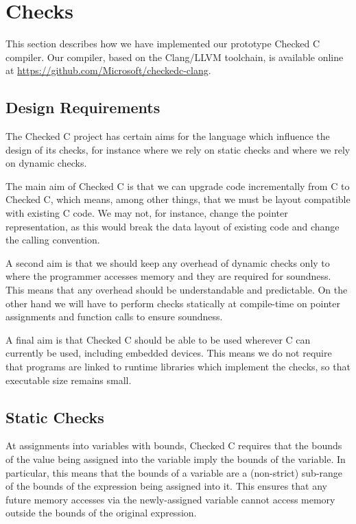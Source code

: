 \chapter{Checks}
\label{sec:checks}

This section describes how we have implemented our prototype Checked C
compiler. Our compiler, based on the Clang/LLVM toolchain, is
available online at \url{https://github.com/Microsoft/checkedc-clang}.

\section{Design Requirements}

The Checked C project has certain aims for the language which
influence the design of its checks, for instance where we rely on
static checks and where we rely on dynamic checks.

The main aim of Checked C is that we can upgrade code incrementally
from C to Checked C, which means, among other things, that we must
be layout compatible with existing C code. We may not, for instance,
change the pointer representation, as this would break the data layout
of existing code and change the calling convention.

A second aim is that we should keep any overhead of dynamic checks
only to where the programmer accesses memory and they are required for
soundness. This means that any overhead should be understandable and
predictable. On the other hand we will have to perform checks
statically at compile-time on pointer assignments and function calls
to ensure soundness.

A final aim is that Checked C should be able to be used wherever C
can currently be used, including embedded devices. This means we do
not require that programs are linked to runtime libraries which
implement the checks, so that executable size remains small.

\section{Static Checks}
\label{sec:static-checks}

At assignments into variables with bounds, Checked C requires that the
bounds of the value being assigned into the variable imply the bounds
of the variable. In particular, this means that the bounds of a
variable are a (non-strict) sub-range of the bounds of the expression
being assigned into it. This ensures that any future memory accesses
via the newly-assigned variable cannot access memory outside the
bounds of the original expression.

